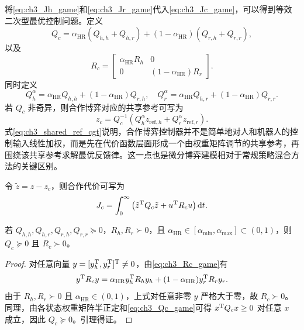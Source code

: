 将\eqref{eq:ch3_Jh_game}和\eqref{eq:ch3_Jr_game}代入\eqref{eq:ch3_Jc_game}，可以得到等效二次型最优控制问题。定义
\begin{equation}
  Q_c=\alpha_{\mathrm{HR}}(Q_{h,h}+Q_{h,r})+(1-\alpha_{\mathrm{HR}})(Q_{r,h}+Q_{r,r}),
  \label{eq:ch3_Qc_game}
\end{equation}
以及
\begin{equation}
  R_c=\begin{bmatrix}\alpha_{\mathrm{HR}}R_h&0\\0&(1-\alpha_{\mathrm{HR}})R_r\end{bmatrix} .
  \label{eq:ch3_Rc_game}
\end{equation}
同时定义
\begin{equation}
  Q_h^{\alpha}=\alpha_{\mathrm{HR}}Q_{h,h}+(1-\alpha_{\mathrm{HR}})Q_{r,h},\quad
  Q_r^{\alpha}=\alpha_{\mathrm{HR}}Q_{h,r}+(1-\alpha_{\mathrm{HR}})Q_{r,r} .
  \label{eq:ch3_Qhr_alpha}
\end{equation}
若 $Q_c$ 非奇异，则合作博弈对应的共享参考可写为
\begin{equation}
  z_c=Q_c^{-1}\left(Q_h^{\alpha}z_{\mathrm{ref},h}+Q_r^{\alpha}z_{\mathrm{ref},r}\right).
  \label{eq:ch3_shared_ref_cgt}
\end{equation}
式\eqref{eq:ch3_shared_ref_cgt}说明，合作博弈控制器并不是简单地对人和机器人的控制输入线性加权，而是先在代价函数层面形成一个由权重矩阵调节的共享参考，再围绕该共享参考求解最优反馈律。这一点也是微分博弈建模相对于常规策略混合方法的关键区别。

令 $\tilde z=z-z_c$，则合作代价可写为
\begin{equation}
  J_c=\int_0^\infty\left(\tilde z^{\mathrm{T}}Q_c\tilde z+u^{\mathrm{T}}R_cu\right)\mathrm{d} t .
  \label{eq:ch3_cgt_lqr_cost}
\end{equation}

\begin{lemma}[固定仲裁参数下加权矩阵的正定性]
\label{lem:ch3_positive}
若 $Q_{h,h},Q_{h,r},Q_{r,h},Q_{r,r}\succeq0$，$R_h,R_r\succ0$，且 $\alpha_{\mathrm{HR}}\in[\alpha_{\min},\alpha_{\max}]\subset(0,1)$，则 $Q_c\succeq0$ 且 $R_c\succ0$。
\end{lemma}

\begin{proof}
对任意向量 $y=[y_h^{\mathrm{T}},y_r^{\mathrm{T}}]^{\mathrm{T}}\ne0$，由\eqref{eq:ch3_Rc_game}有
\begin{equation}
  y^{\mathrm{T}}R_cy=\alpha_{\mathrm{HR}}y_h^{\mathrm{T}}R_hy_h+(1-\alpha_{\mathrm{HR}})y_r^{\mathrm{T}}R_ry_r .
\end{equation}
由于 $R_h,R_r\succ0$ 且 $\alpha_{\mathrm{HR}}\in(0,1)$，上式对任意非零 $y$ 严格大于零，故 $R_c\succ0$。同理，由各状态权重矩阵半正定和\eqref{eq:ch3_Qc_game}可得 $x^{\mathrm{T}}Q_cx\ge0$ 对任意 $x$ 成立，因此 $Q_c\succeq0$。引理得证。
\end{proof}

